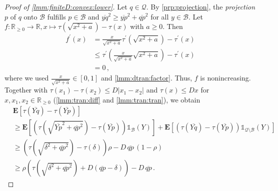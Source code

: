 \documentclass{article}
\newcommand*{\mc}[1]{\mathcal{#1}}
\newcommand{\R}{\mathbb{R}}
\newcommand{\Rp}{\R_{\geq0}}
\newcommand{\lab}{\left[} %
\newcommand{\rab}{\right]} %
\newcommand{\ab}[1]{\lab #1 \rab} %
\newcommand{\abOf}[1]{\!\ab{#1}} %
\newcommand{\lb}{\left(} %
\newcommand{\rb}{\right)} %
\newcommand{\br}[1]{\lb #1 \rb} %
\newcommand{\brOf}[1]{\!\br{#1}} %
\newcommand{\absof}[1]{\vert #1 \vert} %
\newcommand{\E}{\mathbf{E}} %
\newcommand{\EOf}[1]{\E\abOf{#1}}
\newcommand{\pr}{^\prime}
\newcommand{\ind}{\mathds{1}}%
\newcommand{\eqcm}{\,,} %
\newcommand{\eqfs}{\,.}
\newcommand{\ol}[2]{\overline{#1#2}}
\newcommand{\tran}{\tau}
\newcommand{\dtran}{\tau\pr}
\begin{document}
\begin{proof}[Proof of \cref{lmm:finiteD:convex:lower}]
    Let  $q \in \mc Q$. By \cref{prp:projection}, the \textit{projection} $p$ of $q$ onto $\mc B$ fulfills $p \in \mc B$ and $\ol yq^2 \geq \ol yp^2 + \ol qp^2$ for all $y\in \mc B$.
    Let $f\colon\Rp \to \R, x \mapsto \tran(\sqrt{x^2 + a}) - \tran(x)$ with $a \geq 0$.
    Then 
    \begin{align}
        f\pr(x) 
        &= 
        \frac{x}{\sqrt{x^2+a}} \dtran\brOf{\sqrt{x^2 + a}} - \dtran(x)
        \\&\leq
        \dtran\brOf{ \frac{x}{\sqrt{x^2+a}} \sqrt{x^2 + a}} - \dtran(x)
        \\&=
        0
        \eqcm
    \end{align}
    where we used $\frac{x}{\sqrt{x^2+a}} \in [0,1]$ and \cref{lmm:dtran:factor}.
    Thus, $f$ is nonincreasing.
    Together with $\tran(x_1) - \tran(x_2) \leq D \absof{x_1 - x_2}$ and $\tran(x) \leq D x$ for $x, x_1, x_2 \in\Rp$ (\cref{lmm:tran:diff} and \cref{lmm:tran:tran}), we obtain
    \begin{align}
        &\EOf{\tran(\ol Yq) - \tran(\ol Yp)} 
        \\&\geq 
        \EOf{\br{\tran\brOf{\sqrt{\ol Yp^2 + \ol qp^2}} - \tran(\ol Yp)} \ind_{\mc B}(Y)} 
        +
        \EOf{\br{\tran(\ol Yq) - \tran(\ol Yp)} \ind_{\mc Q \setminus \mc B}(Y)} 
        \\&\geq 
        \br{\tran\brOf{\sqrt{\delta^2 + \ol qp^2}} - \tran(\delta)} \rho
        -
        D \,\ol qp\, (1-\rho)
        \\&\geq 
        \rho \br{\tran\brOf{\sqrt{\delta^2 + \ol qp^2}} + D (\ol qp - \delta)} - D\, \ol qp
        \eqfs
    \end{align}
\end{proof}
%
\end{document}
